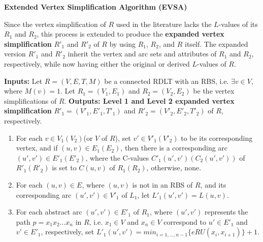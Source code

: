 \documentclass[12pt]{article}
\begin{document}
    \begin{definition} \textbf{Extended Vertex Simplification Algorithm (EVSA)} \cite{malinao-wctp}

    Since the vertex simplification of $R$ used in the literature lacks the $L$-values of its $R_{1}$ and $R_{2}$, this process is extended to produce the \textbf{expanded vertex simplification} $R'_{1}$ and $R'_{2}$ of $R$ by using $R_{1}$, $R_{2}$, and $R$ itself. The expanded version $R'_{1}$ and $R'_{2}$ inherit the vertex and arc sets and attributes of $R_{1}$ and $R_{2}$, respectively, while now having either the original or derived $L$-values of $R$.

    \textbf{Inputs:} Let $R=(V,E,T,M)$ be a connected RDLT with an RBS, i.e. $\exists v \in V$, where $M(v)=1$. Let $R_{1}=(V_{1},E_{1})$ and $R_{2}=(V_{2},E_{2})$ be the vertex simplifications of $R$.
    \textbf{Outputs: Level 1 and Level 2 expanded vertex simplification} $R'_{1}=(V'_{1},E'_{1},T'_{1})$ and $R'_{2}=(V'_{2},E'_{2},T'_{2})$ of $R$, respectively.

    \begin{enumerate}
        \item For each $v \in V_{1}(V_{2})$(or $V$ of $R$), set $v' \in V'_{1}(V'_{2})$ to be its corresponding vertex, and if $(u,v) \in E_{1}(E_{2})$, then there is a corresponding arc $(u',v') \in E'_{1}(E'_{2})$, where the C-values $C'_{1}(u',v')(C_{2}(u',v'))$ of $R'_{1}(R'_2)$ is set to $C(u,v)$ of $R_{1}(R_{2})$, otherwise, none.

        \item For each $(u,v) \in E$, where $(u,v)$ is not in an RBS of $R$, and its corresponding arc $(u',v') \in V'_{1}$ of $L_{1}$, let $L'_{1}(u',v')=L(u,v)$.

        \item For each abstract arc $(u',v') \in E'_{1}$ of $R_{1}$, where $(u',v')$ represents the path $p=x_{1}x_{2}...x_{n}$ in $R$, i.e. $x_{1} \in V$ and $x_{n} \in V$ correspond to $u' \in E'_{1}$ and $v' \in E'_{1}$, respectively, set $L'_{1}(u',v')=min_{i=1,...,n-1} \{eRU(x_{i},x_{i+1})\}+1$.

    \end{enumerate}

    \end{definition}
\end{document}
